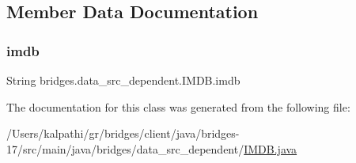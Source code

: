 \subsection{Member Data Documentation}
\mbox{\label{classbridges_1_1data__src__dependent_1_1_i_m_d_b_a2913407abe6019a396d4a2ac086283df}} 
\subsubsection{\texorpdfstring{imdb}{imdb}}
{\footnotesize\ttfamily String bridges.\+data\+\_\+src\+\_\+dependent.\+I\+M\+D\+B.\+imdb\hspace{0.3cm}{\ttfamily [protected]}}



The documentation for this class was generated from the following file\+:\begin{DoxyCompactItemize}
\item 
/\+Users/kalpathi/gr/bridges/client/java/bridges-\/17/src/main/java/bridges/data\+\_\+src\+\_\+dependent/\mbox{\hyperlink{_i_m_d_b_8java}{I\+M\+D\+B.\+java}}\end{DoxyCompactItemize}
